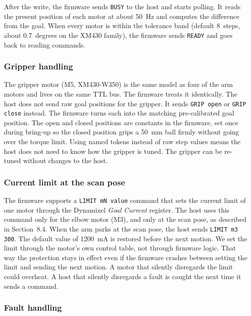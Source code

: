 After the write, the firmware sends \texttt{BUSY} to the host and
starts polling. It reads the present position of each motor at about
50~Hz and computes the difference from the goal. When every motor is
within the tolerance band (default 8~steps, about 0.7~degrees on the
XM430 family), the firmware sends \texttt{READY} and goes back to
reading commands.

\subsubsection*{Gripper handling}

The gripper motor (M5, XM430-W350) is the same model as four of the
arm motors and lives on the same TTL bus. The firmware treats it
identically. The host does not send raw goal positions for the
gripper. It sends \texttt{GRIP open} or \texttt{GRIP close} instead.
The firmware turns each into the matching pre-calibrated goal
position. The open and closed positions are constants in the firmware,
set once during bring-up so the closed position grips a 50~mm ball
firmly without going over the torque limit. Using named tokens
instead of raw step values means the host does not need to know how
the gripper is tuned. The gripper can be re-tuned without changes to
the host.

\subsubsection*{Current limit at the scan pose}

The firmware supports a \texttt{LIMIT mN value} command that sets the
current limit of one motor through the Dynamixel \emph{Goal Current}
register. The host uses this command only for the elbow motor (M3),
and only at the scan pose, as described in Section~8.4.
When the arm parks at the scan pose, the host sends
\texttt{LIMIT m3 300}. The default value of 1200~mA is restored
before the next motion. We set the limit through the motor's own
control table, not through firmware logic. That way the protection
stays in effect even if the firmware crashes between setting the
limit and sending the next motion. A motor that silently disregards
the limit could overheat. A host that silently disregards a fault is
caught the next time it sends a command.

\subsubsection*{Fault handling}

